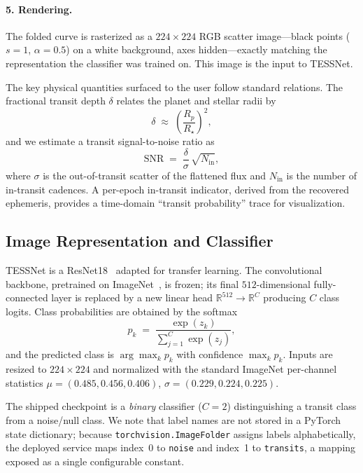 \documentclass[twocolumn,10pt]{article}
\newcommand{\code}[1]{\texttt{\small #1}}
\begin{document}
\paragraph{5. Rendering.} The folded curve is rasterized as a $224\times224$ RGB
scatter image---black points ($s{=}1$, $\alpha{=}0.5$) on a white background, axes
hidden---exactly matching the representation the classifier was trained on. This
image is the input to TESSNet.

The key physical quantities surfaced to the user follow standard relations. The
fractional transit depth $\delta$ relates the planet and stellar radii by
\begin{equation}
  \delta \;\approx\; \left(\frac{R_p}{R_\star}\right)^{2},
\end{equation}
and we estimate a transit signal-to-noise ratio as
\begin{equation}
  \mathrm{SNR} \;=\; \frac{\delta}{\sigma}\,\sqrt{N_{\mathrm{in}}},
  \label{eq:snr}
\end{equation}
where $\sigma$ is the out-of-transit scatter of the flattened flux and
$N_{\mathrm{in}}$ is the number of in-transit cadences. A per-epoch in-transit
indicator, derived from the recovered ephemeris, provides a time-domain
``transit probability'' trace for visualization.

\subsection{Image Representation and Classifier}
TESSNet is a ResNet18~\cite{he2016} adapted for transfer learning. The
convolutional backbone, pretrained on ImageNet~\cite{deng2009}, is frozen; its
final $512$-dimensional fully-connected layer is replaced by a new linear head
$\mathbb{R}^{512}\!\rightarrow\!\mathbb{R}^{C}$ producing $C$ class logits. Class
probabilities are obtained by the softmax
\begin{equation}
  p_k \;=\; \frac{\exp(z_k)}{\sum_{j=1}^{C}\exp(z_j)},
\end{equation}
and the predicted class is $\arg\max_k p_k$ with confidence $\max_k p_k$. Inputs
are resized to $224\times224$ and normalized with the standard ImageNet
per-channel statistics
$\mu=(0.485,0.456,0.406)$, $\sigma=(0.229,0.224,0.225)$.

The shipped checkpoint is a \emph{binary} classifier ($C{=}2$) distinguishing a
transit class from a noise/null class. We note that label names are not stored in
a PyTorch state dictionary; because \code{torchvision.ImageFolder} assigns labels
alphabetically, the deployed service maps index~0 to \code{noise} and index~1 to
\code{transits}, a mapping exposed as a single configurable constant.
\end{document}
